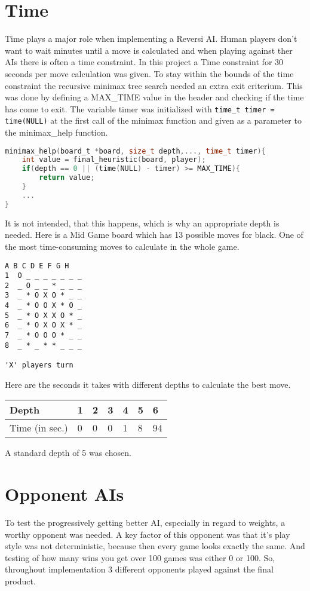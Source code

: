 \section{Time}
Time plays a major role when implementing a Reversi AI. Human players don’t want to wait minutes until a move is calculated and when playing against ther AIs there is often a time constraint. In this project a Time constraint for 30 seconds per move calculation was given. To stay within the bounds of the time constraint the recursive minimax tree search needed an extra exit criterium. \newline This was done by defining a MAX\_TIME value in the header and checking if the time has come to exit. The variable timer was initialized with \verb|time_t timer = time(NULL)| at the first call of the minimax function and given as a parameter to the minimax\_help function.\newpage
\begin{lstlisting}[language=c]
minimax_help(board_t *board, size_t depth,..., time_t timer){
	int value = final_heuristic(board, player);
	if(depth == 0 || (time(NULL) - timer) >= MAX_TIME){
		return value;
	}
	...
}
\end{lstlisting}
It is not intended, that this happens, which is why an appropriate depth is needed. Here is a Mid Game board which has 13 possible moves for black. One of the most time-consuming moves to calculate in the whole game. 
\begin{Verbatim}[frame=single]
   A B C D E F G H
1  O _ _ _ _ _ _ _
2  _ O _ _ * _ _ _
3  _ * O X O * _ _
4  _ * O O X * O _
5  _ * O X X O * _
6  _ * O X O X * _
7  _ * O O O * _ _
8  _ * _ * * _ _ _

'X' players turn
\end{Verbatim}
Here are the seconds it takes with different depths to calculate the best move.
\begin{center}
	\begin{tabular}{ | m{3cm} | m{1cm} m{1cm}  m{1cm} m{1cm} m{1cm} m{1cm} |} 
		\hline
		Depth & 1 & 2 & 3 & 4 & 5 & 6\\ 
		\hline
		Time (in sec.) & 0 & 0 & 0 & 1 & 8 & 94\\ 
		\hline
	\end{tabular}
\end{center}
A standard depth of 5 was chosen.
\section{Opponent AIs}\label{subchapter:opponentAI}
To test the progressively getting better AI, especially in regard to weights, a worthy opponent was needed. A key factor of this opponent was that it’s play style was not deterministic, because then every game looks exactly the same. And testing of how many wins you get over 100 games was either 0 or 100. So, throughout implementation 3 different opponents played against the final product. 
